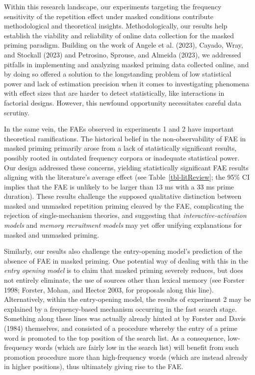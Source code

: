 \documentclass[
]{interact}
\begin{document}
Within this research landscape, our experiments targeting the frequency
sensitivity of the repetition effect under masked conditions contribute
methodological and theoretical insights. Methodologically, our results
help establish the viability and reliability of online data collection
for the masked priming paradigm. Building on the work of Angele et al.
(2023), Cayado, Wray, and Stockall (2023) and Petrosino, Sprouse, and
Almeida (2023), we addressed pitfalls in implementing and analyzing
masked priming data collected online, and by doing so offered a solution
to the longstanding problem of low statistical power and lack of
estimation precision when it comes to investigating phenomena with
effect sizes that are harder to detect statistically, like interactions
in factorial designs. However, this newfound opportunity necessitates
careful data scrutiny.

In the same vein, the FAEs observed in experiments 1 and 2 have
important theoretical ramifications. The historical belief in the
non-observability of FAE in masked priming primarily arose from a lack
of statistically significant results, possibly rooted in outdated
frequency corpora or inadequate statistical power. Our design addressed
these concerns, yielding statistically significant FAE results aligning
with the literature's average effect (see Table~\ref{tbl-litReview}; the
95\% CI implies that the FAE is unlikely to be larger than 13 ms with a
33 ms prime duration). These results challenge the supposed qualitative
distinction between masked and unmasked repetition priming cleaved by
the FAE, complicating the rejection of single-mechanism theories, and
suggesting that \emph{interactive-activation models} and \emph{memory
recruitment models} may yet offer unifying explanations for masked and
unmasked priming.

Similarly, our results also challenge the entry-opening model's
prediction of the absence of FAE in masked priming. One potential way of
dealing with this in the \emph{entry opening model} is to claim that
masked priming severely reduces, but does not entirely eliminate, the
use of sources other than lexical memory (see Forster 1998; Forster,
Mohan, and Hector 2003, for proposals along this line). Alternatively,
within the entry-opening model, the results of experiment 2 may be
explained by a frequency-based mechanism occurring in the fast search
stage. Something along these lines was actually already hinted at by
Forster and Davis (1984) themselves, and consisted of a procedure
whereby the entry of a prime word is promoted to the top position of the
search list. As a consequence, low-frequency words (which are fairly low
in the search list) will benefit from such promotion procedure more than
high-frequency words (which are instead already in higher positions),
thus ultimately giving rise to the FAE.
\end{document}
